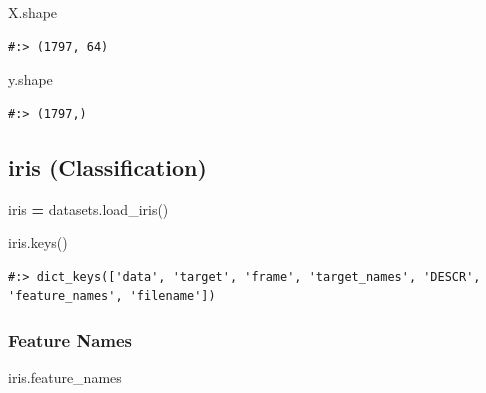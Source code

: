 \documentclass[
]{book}
\newenvironment{Shaded}{\begin{snugshade}}{\end{snugshade}}
\newcommand{\NormalTok}[1]{#1}
\newcommand{\OperatorTok}[1]{\textcolor[rgb]{0.43,0.43,0.43}{\textbf{#1}}}
\begin{document}
\begin{Shaded}
\begin{Highlighting}[]
\NormalTok{X.shape}
\end{Highlighting}
\end{Shaded}

\begin{verbatim}
#:> (1797, 64)
\end{verbatim}

\begin{Shaded}
\begin{Highlighting}[]
\NormalTok{y.shape}
\end{Highlighting}
\end{Shaded}

\begin{verbatim}
#:> (1797,)
\end{verbatim}

\hypertarget{iris-classification}{%
\subsection{iris (Classification)}\label{iris-classification}}

\begin{Shaded}
\begin{Highlighting}[]
\NormalTok{iris }\OperatorTok{=}\NormalTok{ datasets.load_iris()}
\end{Highlighting}
\end{Shaded}

\begin{Shaded}
\begin{Highlighting}[]
\NormalTok{iris.keys()}
\end{Highlighting}
\end{Shaded}

\begin{verbatim}
#:> dict_keys(['data', 'target', 'frame', 'target_names', 'DESCR', 'feature_names', 'filename'])
\end{verbatim}

\hypertarget{feature-names}{%
\subsubsection{Feature Names}\label{feature-names}}

\begin{Shaded}
\begin{Highlighting}[]
\NormalTok{iris.feature_names}
\end{Highlighting}
\end{Shaded}
\end{document}
